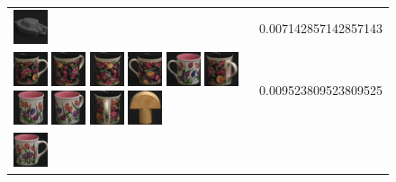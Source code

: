 \begin{figure}[!p]
\begin{center}
\begin{tabular}{m{11cm} | m{3cm} |}
\includegraphics[width=1cm]{coil/beeld-25.eps}
& {\scriptsize 0.007142857142857143}
\\
\includegraphics[width=1cm]{coil/beeld-60.eps}
\includegraphics[width=1cm]{coil/beeld-63.eps}
\includegraphics[width=1cm]{coil/beeld-62.eps}
\includegraphics[width=1cm]{coil/beeld-61.eps}
\includegraphics[width=1cm]{coil/beeld-7.eps}
\includegraphics[width=1cm]{coil/beeld-64.eps}
\includegraphics[width=1cm]{coil/beeld-8.eps}
\includegraphics[width=1cm]{coil/beeld-9.eps}
\includegraphics[width=1cm]{coil/beeld-65.eps}
\includegraphics[width=1cm]{coil/beeld-0.eps}
& {\scriptsize 0.009523809523809525}
\\
\includegraphics[width=1cm]{coil/beeld-6.eps}

\end{tabular}
\end{center}
\end{figure}

